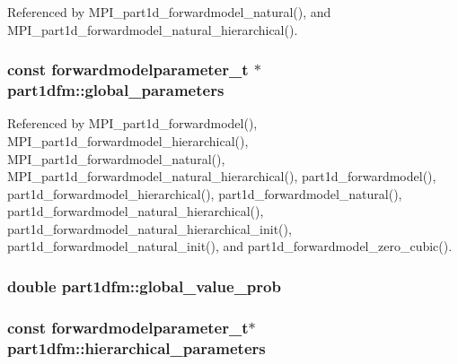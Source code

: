 Referenced by M\+P\+I\+\_\+part1d\+\_\+forwardmodel\+\_\+natural(), and M\+P\+I\+\_\+part1d\+\_\+forwardmodel\+\_\+natural\+\_\+hierarchical().

\subsubsection[{\texorpdfstring{global\+\_\+parameters}{global_parameters}}]{\setlength{\rightskip}{0pt plus 5cm}const {\bf forwardmodelparameter\+\_\+t} $\ast$ part1dfm\+::global\+\_\+parameters}\hypertarget{structpart1dfm_a370fa519f6f7026f02b0d10e1323e865}{}\label{structpart1dfm_a370fa519f6f7026f02b0d10e1323e865}


Referenced by M\+P\+I\+\_\+part1d\+\_\+forwardmodel(), M\+P\+I\+\_\+part1d\+\_\+forwardmodel\+\_\+hierarchical(), M\+P\+I\+\_\+part1d\+\_\+forwardmodel\+\_\+natural(), M\+P\+I\+\_\+part1d\+\_\+forwardmodel\+\_\+natural\+\_\+hierarchical(), part1d\+\_\+forwardmodel(), part1d\+\_\+forwardmodel\+\_\+hierarchical(), part1d\+\_\+forwardmodel\+\_\+natural(), part1d\+\_\+forwardmodel\+\_\+natural\+\_\+hierarchical(), part1d\+\_\+forwardmodel\+\_\+natural\+\_\+hierarchical\+\_\+init(), part1d\+\_\+forwardmodel\+\_\+natural\+\_\+init(), and part1d\+\_\+forwardmodel\+\_\+zero\+\_\+cubic().

\subsubsection[{\texorpdfstring{global\+\_\+value\+\_\+prob}{global_value_prob}}]{\setlength{\rightskip}{0pt plus 5cm}double part1dfm\+::global\+\_\+value\+\_\+prob}\hypertarget{structpart1dfm_a22821f13056a872fa4eba975e55dd441}{}\label{structpart1dfm_a22821f13056a872fa4eba975e55dd441}
\subsubsection[{\texorpdfstring{hierarchical\+\_\+parameters}{hierarchical_parameters}}]{\setlength{\rightskip}{0pt plus 5cm}const {\bf forwardmodelparameter\+\_\+t}$\ast$ part1dfm\+::hierarchical\+\_\+parameters}\hypertarget{structpart1dfm_a3fcdeb881a4b7363a3a2f6a2463d71ec}{}\label{structpart1dfm_a3fcdeb881a4b7363a3a2f6a2463d71ec}


